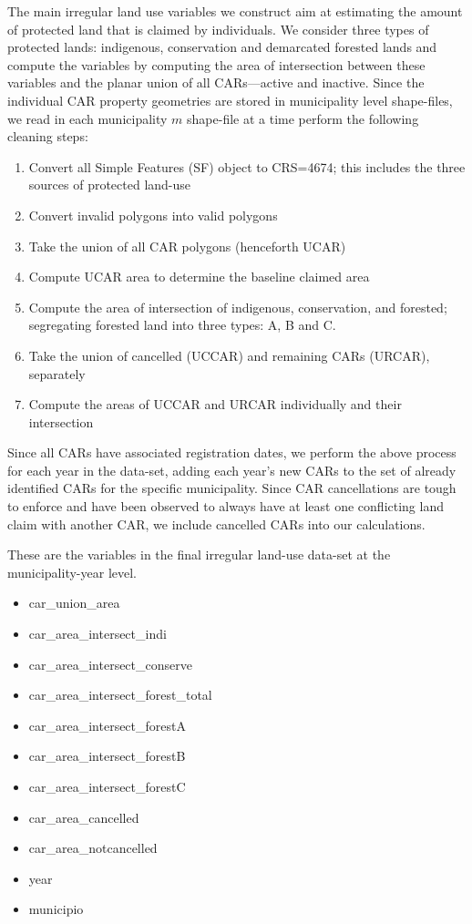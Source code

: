 \documentclass[12pt]{article}
\begin{document}
\begin{appendices}
     The main irregular land use variables we construct aim at estimating the amount of protected land that is claimed by individuals. We consider three types of protected lands: indigenous, conservation and demarcated forested lands and compute the variables by computing the area of intersection between these variables and the planar union of all CARs---active and inactive. Since the individual CAR property geometries are stored in municipality level shape-files, we read in each municipality $m$ shape-file at a time perform the following cleaning steps:
	\begin{enumerate}
		\item Convert all Simple Features (SF) object to CRS=4674; this includes the three sources of protected land-use
		\item Convert invalid polygons into valid polygons
		\item Take the union of all CAR polygons (henceforth UCAR)
            \item Compute UCAR area to determine the baseline claimed area
            \item Compute the area of intersection of indigenous, conservation, and forested; segregating forested land into three types: A, B and C.
            \item Take the union of cancelled (UCCAR) and remaining CARs (URCAR), separately
            \item Compute the areas of UCCAR and URCAR individually and their intersection
	\end{enumerate}

     Since all CARs have associated registration dates, we perform the above process for each year in the data-set, adding each year's new CARs to the set of already identified CARs for the specific municipality. Since CAR cancellations are tough to enforce and have been observed to always have at least one conflicting land claim with another CAR, we include cancelled CARs into our calculations. 
    
    These are the variables in the final irregular land-use data-set at the municipality-year level. 	 
	\begin{itemize}
            \item car\_union\_area
            \item car\_area\_intersect\_indi 
            \item car\_area\_intersect\_conserve 
            \item car\_area\_intersect\_forest\_total 
            \item car\_area\_intersect\_forestA 
            \item car\_area\_intersect\_forestB 
            \item car\_area\_intersect\_forestC 
            \item car\_area\_cancelled  
            \item car\_area\_notcancelled 
            \item year
            \item municipio
	\end{itemize}


\end{appendices}
\end{document}
